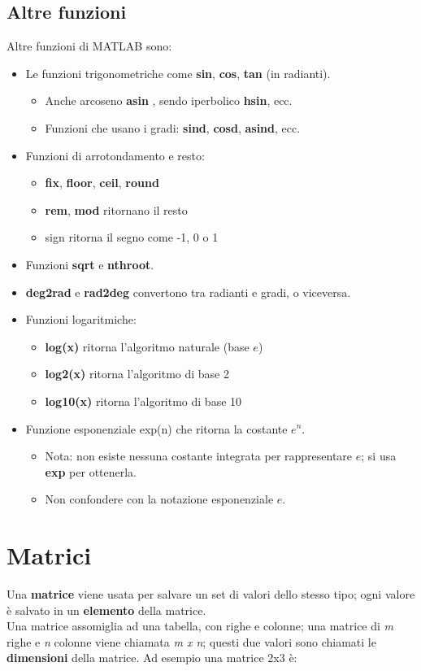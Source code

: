 \documentclass[a4paper, 10pt]{article}
\begin{document}
\subsection{Altre funzioni}
Altre funzioni di MATLAB sono:
\begin{itemize}
\item Le funzioni trigonometriche come \textbf{sin}, \textbf{cos}, \textbf{tan} (in radianti).
	\begin{itemize}
	\item Anche arcoseno \textbf{asin} , sendo iperbolico \textbf{hsin}, ecc.
	\item Funzioni che usano i gradi: \textbf{sind}, \textbf{cosd}, \textbf{asind}, ecc.
	\end{itemize}
\item Funzioni di arrotondamento e resto:
	\begin{itemize}
	\item \textbf{fix}, \textbf{floor}, \textbf{ceil}, \textbf{round}
	\item \textbf{rem}, \textbf{mod} ritornano il resto
	\item sign ritorna il segno come -1, 0 o 1
	\end{itemize}
\item Funzioni \textbf{sqrt} e \textbf{nthroot}.
\item \textbf{deg2rad} e \textbf{rad2deg} convertono tra radianti e gradi, o viceversa.
\item Funzioni logaritmiche:
	\begin{itemize}
	\item \textbf{log(x)} ritorna l'algoritmo naturale (base $e$)
	\item \textbf{log2(x)} ritorna l'algoritmo di base 2
	\item \textbf{log10(x)} ritorna l'algoritmo di base 10
	\end{itemize}
\item Funzione esponenziale exp(n) che ritorna la costante $e^n$.
	\begin{itemize}
	\item Nota: non esiste nessuna costante integrata per rappresentare $e$; si usa \textbf{exp} per ottenerla.
	\item Non confondere con la notazione esponenziale $e$.
	\end{itemize}
\end{itemize}

\newpage

\section{Matrici}
Una \textbf{matrice} viene usata per salvare un set di valori dello stesso tipo; ogni valore è salvato in un \textbf{elemento} della matrice.\\
Una matrice assomiglia ad una tabella, con righe e colonne; una matrice di \textit{m} righe e \textit{n} colonne viene chiamata \textit{m x n}; questi due valori sono chiamati le \textbf{dimensioni} della matrice. Ad esempio una matrice 2x3 è:\\
\end{document}
